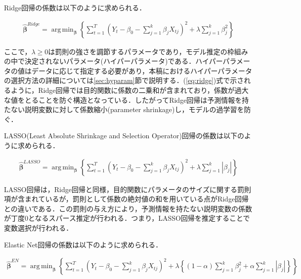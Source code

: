 \documentclass[a4paper，12pt]{jsarticle}
\DeclareMathOperator*{\argmin}{arg\,min}
\begin{document}
Ridge回帰の係数は以下のように求められる．

\begin{equation} \label{eq:ridge}
  \begin{split}
    \hat{\bm{\beta}}^{Ridge} = \argmin_{\bm{\beta}}\left\{ \sum_{t=1}^{T} \left( Y_t - \beta_0 - \sum_{j=1}^{k} \beta_{j} X_{tj} \right)^2 + \lambda \sum_{j=1}^{k} \beta_{j}^{2} \right\}
  \end{split}
\end{equation}

ここで，$\lambda \geq 0$は罰則の強さを調節するパラメータであり，モデル推定の枠組みの中で決定されないパラメータ(ハイパーパラメータ)である．ハイパーパラメータの値はデータに応じて指定する必要があり，本稿におけるハイパーパラメータの選択方法の詳細については\ref{sec:hyparam}節で説明する．(\ref{eq:ridge})式で示されるように，Ridge回帰では目的関数に係数の二乗和が含まれており，係数が過大な値をとることを防ぐ構造となっている．したがってRidge回帰は予測情報を持たない説明変数に対して係数縮小(parameter shrinkage)し，モデルの過学習を防ぐ．

LASSO(Least Absolute Shrinkage and Selection Operator)回帰の係数は以下のように求められる．

\begin{equation} \label{eq:lasso}
  \begin{split}
    \hat{\bm{\beta}}^{LASSO} = \argmin_{\bm{\beta}}\left\{ \sum_{t=1}^{T} \left( Y_t - \beta_0 - \sum_{j=1}^{k} \beta_{j} X_{tj} \right)^2 + \lambda \sum_{j=1}^{k} \left|\beta_{j}\right| \right\}
  \end{split}
\end{equation}

LASSO回帰は，Ridge回帰と同様，目的関数にパラメータのサイズに関する罰則項が含まれているが，罰則として係数の絶対値の和を用いている点がRidge回帰との違いである．この罰則の与え方により，予測情報を持たない説明変数の係数が丁度0となるスパース推定が行われる．つまり，LASSO回帰を推定することで変数選択が行われる．

Elastic Net回帰の係数は以下のように求められる．

\begin{equation}
  \begin{split}
    \hat{\bm{\beta}}^{EN} = \argmin_{\bm{\beta}}\left\{ \sum_{t=1}^{T} \left( Y_t - \beta_0 - \sum_{j=1}^{k} \beta_{j} X_{tj} \right)^2 + 
    \lambda \left\{ 
      \left( 1 - \alpha \right) \sum_{j=1}^{k} \beta_{j}^2 + 
      \alpha \sum_{j=1}^{k} \left|\beta_{j}\right| 
      \right\} 
    \right\}
  \end{split}
\end{equation}
\end{document}
